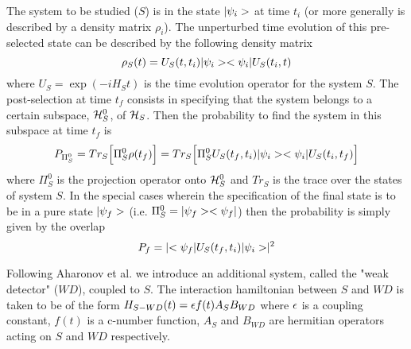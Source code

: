 The system to be studied ($S$) is in the state $\mbox{$ \mbox{$ \vert \psi_i > $} $}$ at
time $t_i$ (or
 more generally is described by a density matrix $\rho_i$).
The unperturbed time
evolution of this pre-selected state
 can be described by the following density matrix
\begin{equation} \rho_S(t) = U_S(t,t_i)\mbox{$ \mbox{$ \vert \psi_i > $} $} \mbox{$ \mbox{$ < \psi_i \vert $} $} U_S(t_i,t) \label{weaki}
\end{equation}  where $U_S = \exp (- i H_S t)$ is the time evolution operator
for the system $S$. The post-selection at time $t_f$ consists in specifying
that the system belongs to a certain subspace, ${\cal H}_S^{0}$, of
${\cal H}_S$.
Then the probability to find the system in
this subspace at time $t_f$ is \begin{equation}
P_{\Pi_S^{0}} = Tr_S \Bigl [ \Pi_S^{0} \rho(t_f) \Bigr] = Tr_S \Bigl[
\Pi_S^{0} U_S(t_f,t_i)\mbox{$ \mbox{$ \vert \psi_i > $} $} \mbox{$ \mbox{$ < \psi_i \vert $} $} U_S(t_i,t_f) \Bigr] \label{weakii}
\end{equation}   where
$\Pi_S^{0}$ is the projection operator onto ${\cal H}_S^0$ and $Tr_S$ is
the trace over the states of system $S$.
In the special cases wherein the specification
of the final state is to be in a pure state $\mbox{$ \vert \psi_f > $}$ (i.e.
$\Pi_S^0=\mbox{$ \vert \psi_f > $}\mbox{$ < \psi_f \vert $}$)
then the probability is simply given by the overlap
\begin{equation}
P_{f}= \vert \mbox{$ < \psi_f \vert $} U_S(t_f,t_i)\mbox{$ \vert \psi_i > $}\vert^2
\end{equation}

Following Aharonov et al. we introduce an additional system, called the "weak
detector" ($WD$), coupled to $S$.
The
interaction hamiltonian between $S$ and $WD$ is taken to be of the form
$H_{S-WD} (t) = \mbox{$ \epsilon $} f(t) A_S B_{WD}$ where $\mbox{$ \epsilon $}$ is a coupling constant,
$f(t)$ is a c-number function, $A_S$ and $B_{WD}$ are hermitian operators
acting
on $S$ and $WD$ respectively.

